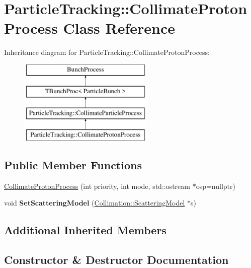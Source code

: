 \hypertarget{classParticleTracking_1_1CollimateProtonProcess}{}\section{Particle\+Tracking\+:\+:Collimate\+Proton\+Process Class Reference}
\label{classParticleTracking_1_1CollimateProtonProcess}
Inheritance diagram for Particle\+Tracking\+:\+:Collimate\+Proton\+Process\+:\begin{figure}[H]
\begin{center}
\leavevmode
\includegraphics[height=4.000000cm]{classParticleTracking_1_1CollimateProtonProcess}
\end{center}
\end{figure}
\subsection*{Public Member Functions}
\begin{DoxyCompactItemize}
\item 
\hyperlink{classParticleTracking_1_1CollimateProtonProcess_aebcb1f9c086ac8e79e76a8382f37f4c3}{Collimate\+Proton\+Process} (int priority, int mode, std\+::ostream $\ast$osp=nullptr)
\item 
\mbox{\label{classParticleTracking_1_1CollimateProtonProcess_a609995f15fbeba015e59c9ce2afba351}} 
void {\bfseries Set\+Scattering\+Model} (\hyperlink{classCollimation_1_1ScatteringModel}{Collimation\+::\+Scattering\+Model} $\ast$s)
\end{DoxyCompactItemize}
\subsection*{Additional Inherited Members}


\subsection{Constructor \& Destructor Documentation}
\mbox{\label{classParticleTracking_1_1CollimateProtonProcess_aebcb1f9c086ac8e79e76a8382f37f4c3}} 

